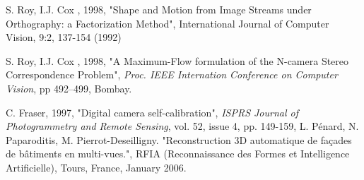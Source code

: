 \documentclass[a4paper]{book}
\begin{document}
\begin{thebibliography}{AAA}
      S. Roy, I.J. Cox , 1998, "Shape and Motion from Image 
            Streams under Orthography: a Factorization Method", International Journal of Computer Vision, 
            9:2, 137-154 (1992)


      S. Roy, I.J. Cox , 1998, "A Maximum-Flow
            formulation of the N-camera Stereo Correspondence
      Problem", \emph{Proc. IEEE Internation Conference on
      Computer Vision}, pp 492--499, Bombay.

     C. Fraser, 1997, "Digital camera self-calibration",
   \emph{ISPRS Journal of Photogrammetry and Remote Sensing}, vol. 52, issue 4, pp. 149-159,
      L. Pénard, N. Paparoditis, M. Pierrot-Deseilligny.
           "Reconstruction 3D automatique de façades de bâtiments en multi-vues.",
            RFIA (Reconnaissance des Formes et Intelligence Artificielle),
            Tours, France, January 2006.
\end{thebibliography}


\printindex
\end{document}

